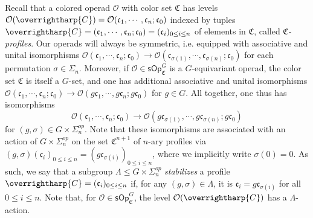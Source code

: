 \documentclass[a4paper,10pt
]{article}%
\numberwithin{equation}{section}
\numberwithin{figure}{section}
\theoremstyle{definition} %
\newcommand{\vect}[1]{\text{\overrightharp{\ensuremath{#1}}}}
\renewcommand{\O}{\ensuremath{\mathcal O}}
\newcommand{\1}{\ensuremath{\mathbbm 1}}%
\begin{document}
Recall that a colored operad $\O$
with color set $\mathfrak{C}$ has levels 
$
\O(\vect{C})=
\O(\mathfrak{c}_1,\cdots,\mathfrak{c}_n;\mathfrak{c}_0)$
indexed by tuples
$\vect{C} = (\mathfrak{c}_1,\cdots,\mathfrak{c}_n;\mathfrak{c}_0) = (\mathfrak c_i)_{0 \leq i \leq n}$
of elements in $\mathfrak{C}$, called \emph{$\mathfrak{C}$-profiles}.
Our operads will always be symmetric, i.e. equipped with associative and unital isomorphisms
$
\O(\mathfrak{c}_1,\cdots,\mathfrak{c}_n;\mathfrak{c}_0) \to 
\O(\mathfrak{c}_{\sigma(1)},\cdots,\mathfrak{c}_{\sigma(n)};\mathfrak{c}_0)
$
for each permutation $\sigma \in \Sigma_n$.
Moreover, if 
$\O \in \mathsf{sOp}^G_{\mathfrak{C}}$
is a $G$-equivariant operad, 
the color set $\mathfrak{C}$ is itself a $G$-set,
and one has additional associative and unital isomorphisms
$
\O(\mathfrak{c}_1,\cdots,\mathfrak{c}_n;\mathfrak{c}_0) \to 
\O(g\mathfrak{c}_{1},\cdots,g\mathfrak{c}_{n};g\mathfrak{c}_0)
$ for $g \in G$.
All together, one thus has isomorphisms
\begin{equation}\label{OPSSYMS EQ}
\O(\mathfrak{c}_1,\cdots,\mathfrak{c}_n;\mathfrak{c}_0)
\to 
\O(g \mathfrak{c}_{\sigma(1)},\cdots,g \mathfrak{c}_{\sigma(n)};g\mathfrak{c}_0)
\end{equation}
for $(g,\sigma) \in G \times \Sigma_n^{op}$.
Note that these isomorphisms 
are associated with an action of 
$G \times \Sigma_n^{op}$
on the set $\mathfrak{C}^{n+1}$ of $n$-ary profiles via
$(g,\sigma) (\mathfrak{c}_i)_{0\leq i \leq n}
= (g \mathfrak{c}_{\sigma(i)})_{0\leq i \leq n}$,
where we implicitly write $\sigma(0)=0$.
As such, we say that a subgroup 
$\Lambda \leq G \times \Sigma_n^{op}$
\emph{stabilizes} a profile $\vect{C}=(\mathfrak{c}_i)_{0 \leq i \leq n}$ if,
for any $(g,\sigma) \in \Lambda$,
it is 
$\mathfrak{c}_i = g \mathfrak{c}_{\sigma(i)}$ for all $0 \leq i \leq n$.
Note that,
for $\O \in \mathsf{sOp}^G_{\mathfrak{C}}$,
the level $\O(\vect{C})$ has a $\Lambda$-action.
\end{document}
